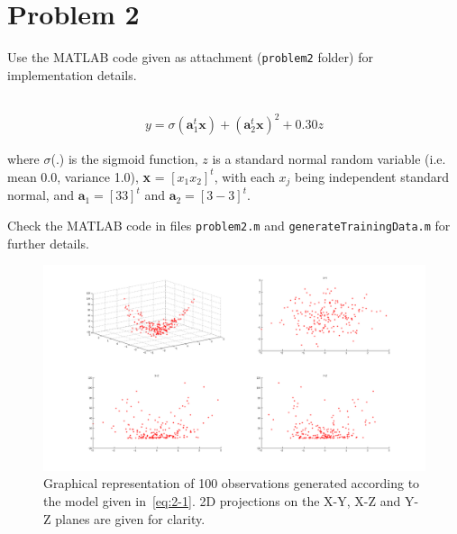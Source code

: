 \documentclass[paper=a4, fontsize=11pt]{scrartcl} %
\numberwithin{equation}{section} %
\numberwithin{figure}{section} %
\numberwithin{table}{section} %
\newcommand{\vertbreak}{\vspace{1.75 mm}}
\begin{document}
\section{Problem 2}

Use the MATLAB code given as attachment (\verb+problem2+ folder) for 
implementation details.

\subsection{}
\label{subsec:2-1}

\begin{equation}
\begin{split}
    y = \sigma(\textbf{a}^{t}_1\textbf{x}) + (\textbf{a}^{t}_2\textbf{x})^2 + 
        0.30z
    \label{eq:2-1}
\end{split}
\end{equation}

where $\sigma$(.) is the sigmoid function, $z$ is a standard normal random 
variable (i.e. mean 0.0, variance 1.0), \textbf{x} = $[x_1 x_2]^t$, with each 
$x_j$ being independent standard normal, and $\textbf{a}_1 = [3 3]^t$ and 
$\textbf{a}_2 = [3 -3]^t$.\vertbreak

Check the MATLAB code in files \verb+problem2.m+ and 
\verb+generateTrainingData.m+ for further details.

\begin{figure}[h!]

    \centering
    \includegraphics[width=1.00\textwidth]{figures/2-1.png}
    \caption{Graphical representation of 100 observations generated according 
        to the model given in~\ref{eq:2-1}. 2D projections on the X-Y, X-Z and 
        Y-Z planes are given for clarity.}
    \label{fig:2-1}

\end{figure}
\end{document}
